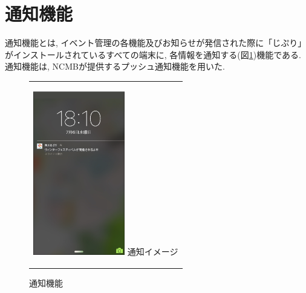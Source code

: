 \section{通知機能}%
\label{func:notice}
通知機能とは, イベント管理の各機能及びお知らせが発信された際に「じぷり」がインストールされているすべての端末に, 各情報を通知する(図\ref{fig:notice})機能である. 通知機能は, NCMBが提供するプッシュ通知機能を用いた.

\begin{figure}[htbp]
  \begin{center}
    \begin{tabular}{c}

      \begin{minipage}{0.33\hsize}
        \begin{center}
\includegraphics[width=4cm]{notification.png}
          \hspace{1cm} %
          {\footnotesize 通知イメージ}
        \end{center}
      \end{minipage}

    \end{tabular}
    \caption{通知機能}
    \label{fig:notice}
  \end{center}
\end{figure}

